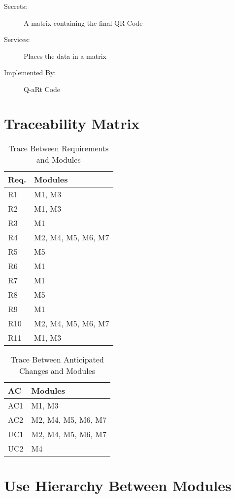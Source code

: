 \documentclass[12pt, titlepage]{article}
\begin{document}
\begin{description}
\item[Secrets:] A matrix containing the final QR Code
\item[Services:] Places the data in a matrix
\item[Implemented By:] Q-aRt Code
\end{description}

\section{Traceability Matrix} \label{SecTM}


\begin{table}[H]
\centering
\begin{tabular}{p{} p{}}
\toprule
\textbf{Req.} & \textbf{Modules}\\
\midrule
R1 & M1, M3\\
R2 & M1, M3\\
R3 & M1\\
R4 & M2, M4, M5, M6, M7\\
R5 & M5\\
R6 & M1\\
R7 & M1\\
R8 & M5\\
R9 & M1\\
R10 & M2, M4, M5, M6, M7\\
R11 & M1, M3\\
\bottomrule
\end{tabular}
\caption{Trace Between Requirements and Modules}
\label{TblRT}
\end{table}

\begin{table}[H]
\centering
\begin{tabular}{p{} p{}}
\toprule
\textbf{AC} & \textbf{Modules}\\
\midrule
AC1 & M1, M3\\
AC2 & M2, M4, M5, M6, M7\\
UC1 & M2, M4, M5, M6, M7\\
UC2 & M4\\
\bottomrule
\end{tabular}
\caption{Trace Between Anticipated Changes and Modules}
\label{TblACT}
\end{table}

\section{Use Hierarchy Between Modules} \label{SecUse}
\end{document}
